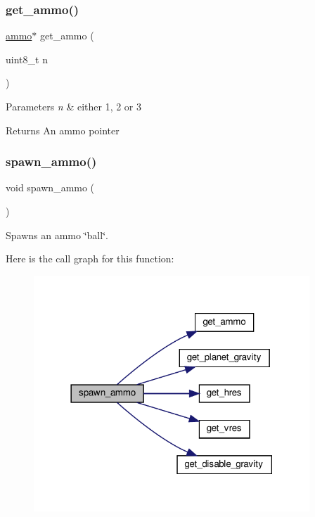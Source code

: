 \subsubsection{\texorpdfstring{get\+\_\+ammo()}{get\_ammo()}}
{\footnotesize\ttfamily \hyperlink{structammo}{ammo}$\ast$ get\+\_\+ammo (\begin{DoxyParamCaption}\item[{uint8\+\_\+t}]{n }\end{DoxyParamCaption})}


\begin{DoxyParams}{Parameters}
{\em n} & either 1, 2 or 3 \\
\hline
\end{DoxyParams}
\begin{DoxyReturn}{Returns}
An ammo pointer 
\end{DoxyReturn}
\mbox{\label{group__ammo_gac8e56296d8320fc25379a842c74fd72e}} 
\subsubsection{\texorpdfstring{spawn\+\_\+ammo()}{spawn\_ammo()}}
{\footnotesize\ttfamily void spawn\+\_\+ammo (\begin{DoxyParamCaption}{ }\end{DoxyParamCaption})}



Spawns an ammo \char`\"{}ball\char`\"{}. 

Here is the call graph for this function\+:\nopagebreak
\begin{figure}[H]
\begin{center}
\leavevmode
\includegraphics[width=294pt]{group__ammo_gac8e56296d8320fc25379a842c74fd72e_cgraph}
\end{center}
\end{figure}
